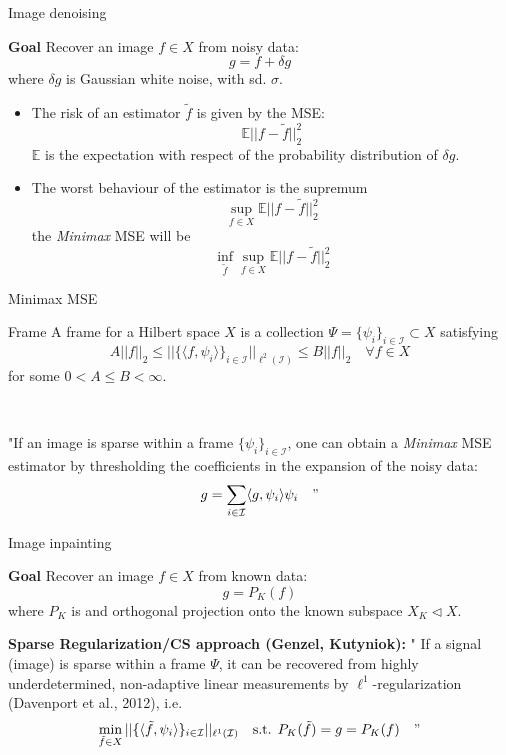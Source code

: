 \begin{frame}{Image denoising}
\begin{block}{\textbf{Goal}}
 Recover an image $f\in X$ from noisy data:
$$
g = f+\delta g
$$
where $\delta g$ is Gaussian white noise, with sd. $\sigma$.
\end{block}

\pause
\bigskip
\begin{itemize}
\item The risk of an estimator $\tilde{f}$ is given by the MSE:
$$
\mathbb{E}||f-\tilde{f}||_2^2
$$
$\mathbb{E}$ is the expectation with respect of the probability distribution of $\delta g$.
\pause
\bigskip
\item The worst behaviour of the estimator is the supremum
$$
\sup_{f\in X} \mathbb{E}||f-\tilde{f}||_2^2
$$
the \textit{Minimax} MSE will be
$$
\inf_{\tilde{f}}\sup_{f\in X}\mathbb{E}||f-\tilde{f}||^2_2
$$

\end{itemize}
\end{frame}

\begin{frame}{Minimax MSE}

\begin{block}{Frame}
A frame for a Hilbert space $X$ is a collection $\Psi=\{\psi_i\}_{i\in\mathcal{I}}\subset X$ satisfying
$$
A ||f||_2\leq ||\{\langle f,\psi_i\rangle\}_{i\in\mathcal{I}}||_{\ell^2(\mathcal{I})}\leq B||f||_2  \quad \forall f\in X
$$
for some $0<A\leq B<\infty$.
\end{block}

\
\pause

\begin{theorem}[(Labate et al., 2012)]
"If an image is sparse within a frame $\{\psi_i\}_{i\in \mathcal{I}}$, one can obtain a \textit{Minimax} MSE estimator by thresholding the coefficients in the expansion of the noisy data:
$$
g = \sum_{i\in\mathcal{I}}\langle g,\psi_i\rangle\psi_i \quad "
$$
\end{theorem}
\end{frame}

\begin{frame}{Image inpainting}

\begin{block}{\textbf{Goal}}
 Recover an image $f\in X$ from known data:
$$
g = P_K(f)
$$
where $P_K$ is and orthogonal projection onto the known subspace $X_K\triangleleft X$.
\end{block}

\pause
\bigskip

\begin{block}{\textbf{Sparse Regularization/CS approach (Genzel, Kutyniok):}}
 " If a signal (image) is sparse within a frame $\Psi$, it can be recovered from highly underdetermined, non-adaptive linear measurements by $\ell^1$-regularization (Davenport et al., 2012), i.e.
$$
\min_{\tilde{f}\in X}||\{\langle\tilde{f},\psi_i\rangle\}_{i\in\mathcal{I}}||_{\ell^1(\mathcal{I})} \quad \text{s.t. }P_K(\tilde{f})=g=P_K(f) \quad "
$$

\end{block}

\end{frame}

